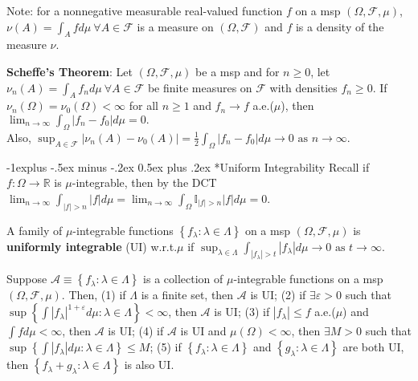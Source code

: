 \documentclass[paper=letter,fontsize=2.89mm]{scrartcl}
\makeatletter
\newcommand{\eps}{\varepsilon}
\newcommand{\R}{\mathbb{R}}
\newcommand\indicate[1]{\mathbb{I}_{ #1 }}
\newcommand\abs[1]{\left| #1 \right|}
\newcommand\set[1]{\left\{ #1 \right\}}
\renewcommand{\subsection}{\@startsection{subsection}{2}{0mm}%
                                {-1explus -.5ex minus -.2ex}%
                                {0.5ex plus .2ex}%
                                {\normalfont\normalsize\bfseries}}
\makeatother
\begin{document}
\begin{multicols*}{3}
Note: for a nonnegative measurable real-valued function $f$ on a msp $(\Omega, \mathcal{F}, \mu)$, $\nu(A) = \int_A fd\mu ~\forall A \in \mathcal{F}$ is a measure on $(\Omega, \mathcal{F})$ and $f$ is a density of the measure $\nu$. \\\medskip

\textbf{Scheffe's Theorem}: Let $(\Omega, \mathcal{F}, \mu)$ be a msp and for $n \ge 0$, let $\nu_n(A) = \int_A f_n d\mu ~\forall A \in \mathcal{F}$ be finite measures on $\mathcal{F}$ with densities $f_n \ge 0$. If $\nu_n(\Omega) = \nu_0(\Omega) < \infty$ for all $n \ge 1$ and $f_n \to f$ a.e.($\mu$), then $\lim_{n\to\infty} \int_\Omega \abs{f_n-f_0}d\mu = 0.$ \\
Also, $\sup_{A\in\mathcal{F}} \abs{\nu_n(A) - \nu_0(A)} =\frac{1}{2}\int_\Omega \abs{f_n - f_0}d\mu \to 0 \text{ as } n \to \infty$. \\ \medskip

\subsection*{Uniform Integrability}
Recall if $f: \Omega \to \R$ is $\mu$-integrable, then by the DCT $\lim_{n\to\infty}\int_{\abs{f}>n} \abs{f}d\mu = \lim_{n\to\infty}\int_\Omega \indicate{\abs{f}>n}\abs{f}d\mu=0$. \\ \medskip

A family of $\mu$-integrable functions $\set{f_\lambda: \lambda \in \Lambda}$ on a msp $(\Omega, \mathcal{F}, \mu)$ is \textbf{uniformly integrable} (UI) w.r.t.\@ $\mu$ if 
$\sup_{\lambda \in \Lambda} \int_{\abs{f_\lambda}>t}\abs{f_\lambda}d\mu \to 0 \text{ as } t \to \infty$. \\ \medskip

Suppose $\mathcal{A} \equiv \set{f_\lambda: \lambda \in \Lambda}$ is a collection of $\mu$-integrable functions on a msp $(\Omega, \mathcal{F}, \mu)$. Then,
(1) if $\Lambda$ is a finite set, then $\mathcal{A}$ is UI; (2) if $\exists \eps > 0$ such that $\sup\set{\int\abs{f_\lambda}^{1+\eps}d\mu:\lambda \in \Lambda} < \infty$, then $\mathcal{A}$ is UI; (3) if $\abs{f_\lambda} \le f$ a.e.($\mu$) and $\int f d\mu < \infty$, then $\mathcal{A}$ is UI; (4) if $\mathcal{A}$ is UI and $\mu(\Omega) < \infty$, then $\exists M > 0$ such that $\sup\set{\int\abs{f_\lambda}d\mu:\lambda \in \Lambda} \le M$; (5) if $\set{f_\lambda: \lambda \in \Lambda}$ and $\set{g_\lambda: \lambda \in \Lambda}$ are both UI, then $\set{f_\lambda + g_\lambda: \lambda \in \Lambda}$ is also UI.\\ \medskip


\end{multicols*}
\end{document}
